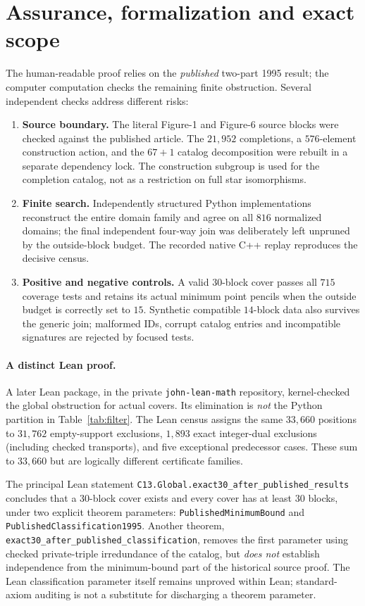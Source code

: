 \documentclass[11pt]{article}
\theoremstyle{definition}
\theoremstyle{remark}
\begin{document}
\section{Assurance, formalization and exact scope}
The human-readable proof relies on the \emph{published} two-part
1995 result; the computer computation checks the remaining finite
obstruction. Several independent checks address different risks:
\begin{enumerate}
\item \textbf{Source boundary.} The literal Figure-1 and Figure-6
source blocks were checked against the published article. The
$21{,}952$ completions, a $576$-element construction action, and the
$67+1$ catalog decomposition were rebuilt in a separate dependency
lock. The construction subgroup is used for the completion catalog,
not as a restriction on full star isomorphisms.
\item \textbf{Finite search.} Independently structured Python
implementations reconstruct the entire domain family and agree on
all $816$ normalized domains; the final independent four-way join
was deliberately left unpruned by the outside-block budget. The
recorded native C++ replay reproduces the decisive census.
\item \textbf{Positive and negative controls.} A valid $30$-block
cover passes all $715$ coverage tests and retains its actual minimum
point pencils when the outside budget is correctly set to $15$.
Synthetic compatible $14$-block data also survives the generic join;
malformed IDs, corrupt catalog entries and incompatible signatures
are rejected by focused tests.
\end{enumerate}

\paragraph{A distinct Lean proof.}
A later Lean package, in the private \texttt{john-lean-math}
repository, kernel-checked the global obstruction for actual covers.
Its elimination is \emph{not} the Python partition in
Table~\ref{tab:filter}. The Lean census assigns the same $33{,}660$
positions to $31{,}762$ empty-support exclusions, $1{,}893$ exact
integer-dual exclusions (including checked transports), and five
exceptional predecessor cases. These sum to $33{,}660$ but are
logically different certificate families.

The principal Lean statement
\texttt{C13.Global.exact30\_after\_published\_results} concludes that
a $30$-block cover exists and every cover has at least $30$ blocks,
under two explicit theorem parameters:
\texttt{PublishedMinimumBound} and
\texttt{PublishedClassification1995}. Another theorem,
\texttt{exact30\_after\_published\_classification}, removes the
first parameter using checked private-triple irredundance of the
catalog, but \emph{does not} establish independence from the
minimum-bound part of the historical source proof. The Lean
classification parameter itself remains unproved within Lean;
standard-axiom auditing is not a substitute for discharging a
theorem parameter.
\end{document}

